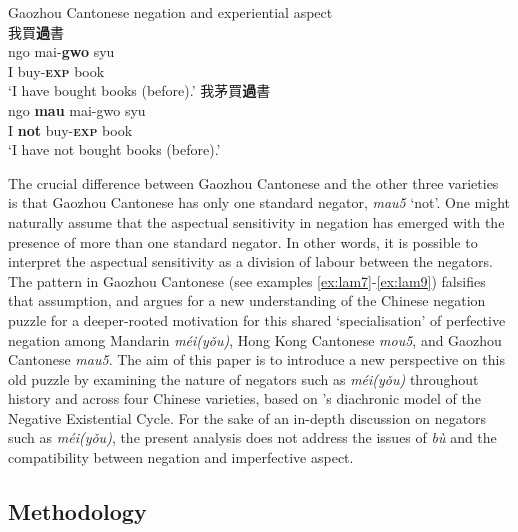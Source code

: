 \documentclass[output=paper]{langscibook}
\begin{document}
\ea Gaozhou Cantonese negation and experiential aspect \label{ex:lam9}\\
  \ea 我買\textbf{過}書 \label{ex:lam9a}\\
  	\gll ngo mai-\textbf{gwo} syu \\
  	I buy-\textbf{\textsc{exp}} book\\
  	\glt `I have bought books (before).'
  \ex 我茅買\textbf{過}書 \label{ex:lam9b}\\
  	\gll ngo	 \textbf{mau} mai-gwo syu \\
  	I \textbf{not} buy-\textbf{\textsc{exp}} book\\
  	\glt `I have not bought books (before).'
\z \z 


The crucial difference between Gaozhou Cantonese and the other three varieties is that Gaozhou Cantonese has only one standard negator, \textit{mau5} `not'. One might naturally assume that the aspectual sensitivity in negation has emerged with the presence of more than one standard negator. In other words, it is possible to interpret the aspectual sensitivity as a division of labour between the negators. The pattern in Gaozhou Cantonese (see examples \ref{ex:lam7}-\ref{ex:lam9}) falsifies that assumption, and argues for a new understanding of the Chinese negation puzzle for a deeper-rooted motivation for this shared `specialisation' of perfective negation among Mandarin \textit{méi(yǒu)}, Hong Kong Cantonese \textit{mou5}, and Gaozhou Cantonese \textit{mau5}. The aim of this paper is to introduce a new perspective on this old puzzle by examining the nature of negators such as \textit{méi(yǒu)} throughout history and across four Chinese varieties, based on \citeauthor{Croft1991}'s diachronic model of the Negative Existential Cycle. For the sake of an in-depth discussion on negators such as \textit{méi(yǒu)}, the present analysis does not address the issues of \textit{bù} and the compatibility between negation and imperfective aspect.


\subsection{Methodology}\label{s:lam2-2}
\end{document}
